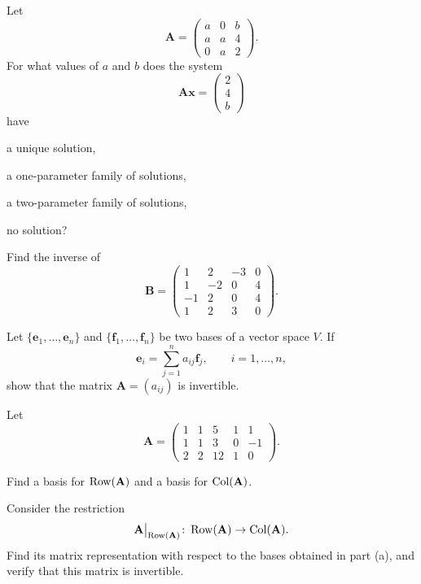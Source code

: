 \begin{problem}
Let
\[
\mathbf A=
\begin{pmatrix}
a&0&b\\
a&a&4\\
0&a&2
\end{pmatrix}.
\]
For what values of $a$ and $b$ does the system
\[
\mathbf A\mathbf x=
\begin{pmatrix}
2\\4\\b
\end{pmatrix}
\]
have
\begin{problemchoices}
\item a unique solution,
\item a one-parameter family of solutions,
\item a two-parameter family of solutions,
\item no solution?
\end{problemchoices}
\end{problem}

\begin{problem}
Find the inverse of
\[
\mathbf B=
\begin{pmatrix}
1&2&-3&0\\
1&-2&0&4\\
-1&2&0&4\\
1&2&3&0
\end{pmatrix}.
\]
\end{problem}

\begin{problem}
Let $\{\mathbf e_1,\dots,\mathbf e_n\}$ and $\{\mathbf f_1,\dots,\mathbf f_n\}$ be two bases of a vector space $V$. If
\[
\mathbf e_i=\sum_{j=1}^n a_{ij}\mathbf f_j,
\qquad i=1,\dots,n,
\]
show that the matrix $\mathbf A=(a_{ij})$ is invertible.
\end{problem}

\begin{problem}
Let
\[
\mathbf A=
\begin{pmatrix}
1&1&5&1&1\\
1&1&3&0&-1\\
2&2&12&1&0
\end{pmatrix}.
\]
\begin{problemsubparts}
\item Find a basis for $\operatorname{Row}(\mathbf A)$ and a basis for $\operatorname{Col}(\mathbf A)$.
\item Consider the restriction
\[
\mathbf A\big|_{\operatorname{Row}(\mathbf A)}\colon \operatorname{Row}(\mathbf A)\to\operatorname{Col}(\mathbf A).
\]
Find its matrix representation with respect to the bases obtained in part \textup{(a)}, and verify that this matrix is invertible.
\end{problemsubparts}
\end{problem}

